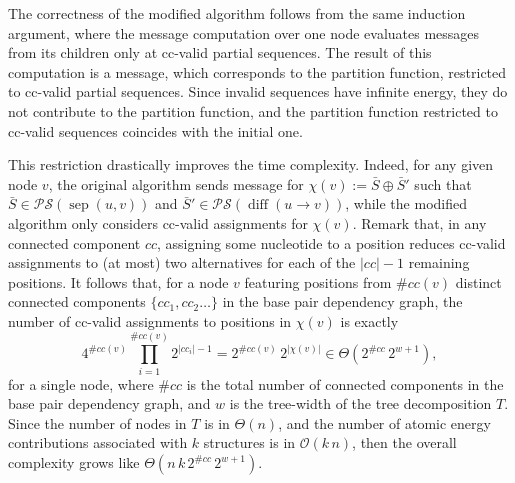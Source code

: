 \documentclass[10pt]{article}
\newcommand{\val}{\bar S} %
\newcommand{\separator}[2]{\operatorname{sep}(#1,#2)}
\newcommand{\difference}[2]{\operatorname{diff}(#1 \rightarrow #2)}
\newcommand{\partseqs}{\mathcal{P\!S}}
\newcommand{\substitute}[2]{#1\!\oplus\!#2}
\begin{document}
The correctness of the modified algorithm follows from the same
induction argument, where the message computation over one node
evaluates messages from its children only at cc-valid partial
sequences. The result of this computation is a message, which corresponds
to the partition function, restricted to cc-valid partial sequences.
Since invalid sequences have infinite energy, they do not contribute to
the partition function, and the partition function restricted to cc-valid sequences coincides
with the initial one.



This restriction drastically improves the time
complexity. Indeed, for any given node $v$, the original algorithm sends message for
 $\chi(v):=\substitute{\val}{\val'}$ such that
$\val\in\partseqs(\separator{u}{v})$ and
$\val'\in\partseqs(\difference{u}{v})$, while the modified algorithm
only considers cc-valid assignments for $\chi(v)$. Remark that, in any connected component $cc$,
assigning some nucleotide to a position reduces cc-valid assignments to (at most)
two alternatives for each of the $|cc|-1$ remaining positions. It follows that, for a node $v$ featuring positions from $\#cc(v)$ distinct connected components $\{cc_1,cc_2\ldots\}$ in the base pair dependency graph, the number of cc-valid assignments to positions in $\chi(v)$ is exactly
$$4^{\#cc(v)}\prod_{i=1}^{\#cc(v)} 2^{|cc_i|-1} = 2^{\#cc(v)}\, 2^{|\chi(v)|} \in \Theta(2^{\#cc}\, 2^{w+1}),$$
for a single node, where $\#cc$ is the total number of connected components in the base pair dependency graph, and $w$ is the tree-width of the tree decomposition $T$. Since the number of nodes in $T$ is in $\Theta(n)$, and the number of atomic energy contributions associated with $k$ structures is in $\mathcal{O}(k\,n)$, then the overall complexity grows like $\Theta(n\, k\, 2^{\#cc}\, 2^{w+1})$.

%
%
\end{document}

